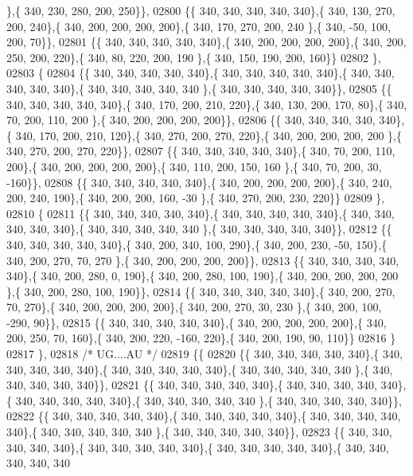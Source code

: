 \begin{DoxyCode}
      \},\{ 340, 230, 280, 200, 250\}\},
02800 \{\{ 340, 340, 340, 340, 340\},\{ 340, 130, 270, 200, 240\},\{ 340, 200, 200, 200, 200\},\{ 340, 170, 270, 200, 240
      \},\{ 340, -50, 100, 200,  70\}\},
02801 \{\{ 340, 340, 340, 340, 340\},\{ 340, 200, 200, 200, 200\},\{ 340, 200, 250, 200, 220\},\{ 340,  80, 220, 200, 190
      \},\{ 340, 150, 190, 200, 160\}\}
02802 \},
02803 \{
02804 \{\{ 340, 340, 340, 340, 340\},\{ 340, 340, 340, 340, 340\},\{ 340, 340, 340, 340, 340\},\{ 340, 340, 340, 340, 340
      \},\{ 340, 340, 340, 340, 340\}\},
02805 \{\{ 340, 340, 340, 340, 340\},\{ 340, 170, 200, 210, 220\},\{ 340, 130, 200, 170,  80\},\{ 340,  70, 200, 110, 200
      \},\{ 340, 200, 200, 200, 200\}\},
02806 \{\{ 340, 340, 340, 340, 340\},\{ 340, 170, 200, 210, 120\},\{ 340, 270, 200, 270, 220\},\{ 340, 200, 200, 200, 200
      \},\{ 340, 270, 200, 270, 220\}\},
02807 \{\{ 340, 340, 340, 340, 340\},\{ 340,  70, 200, 110, 200\},\{ 340, 200, 200, 200, 200\},\{ 340, 110, 200, 150, 160
      \},\{ 340,  70, 200,  30, -160\}\},
02808 \{\{ 340, 340, 340, 340, 340\},\{ 340, 200, 200, 200, 200\},\{ 340, 240, 200, 240, 190\},\{ 340, 200, 200, 160, -30
      \},\{ 340, 270, 200, 230, 220\}\}
02809 \},
02810 \{
02811 \{\{ 340, 340, 340, 340, 340\},\{ 340, 340, 340, 340, 340\},\{ 340, 340, 340, 340, 340\},\{ 340, 340, 340, 340, 340
      \},\{ 340, 340, 340, 340, 340\}\},
02812 \{\{ 340, 340, 340, 340, 340\},\{ 340, 200, 340, 100, 290\},\{ 340, 200, 230, -50, 150\},\{ 340, 200, 270,  70, 270
      \},\{ 340, 200, 200, 200, 200\}\},
02813 \{\{ 340, 340, 340, 340, 340\},\{ 340, 200, 280,   0, 190\},\{ 340, 200, 280, 100, 190\},\{ 340, 200, 200, 200, 200
      \},\{ 340, 200, 280, 100, 190\}\},
02814 \{\{ 340, 340, 340, 340, 340\},\{ 340, 200, 270,  70, 270\},\{ 340, 200, 200, 200, 200\},\{ 340, 200, 270,  30, 230
      \},\{ 340, 200, 100, -290,  90\}\},
02815 \{\{ 340, 340, 340, 340, 340\},\{ 340, 200, 200, 200, 200\},\{ 340, 200, 250,  70, 160\},\{ 340, 200, 220, -160, 
      220\},\{ 340, 200, 190,  90, 110\}\}
02816 \}
02817 \},
02818 \textcolor{comment}{/* UG....AU */}
02819 \{\{
02820 \{\{ 340, 340, 340, 340, 340\},\{ 340, 340, 340, 340, 340\},\{ 340, 340, 340, 340, 340\},\{ 340, 340, 340, 340, 340
      \},\{ 340, 340, 340, 340, 340\}\},
02821 \{\{ 340, 340, 340, 340, 340\},\{ 340, 340, 340, 340, 340\},\{ 340, 340, 340, 340, 340\},\{ 340, 340, 340, 340, 340
      \},\{ 340, 340, 340, 340, 340\}\},
02822 \{\{ 340, 340, 340, 340, 340\},\{ 340, 340, 340, 340, 340\},\{ 340, 340, 340, 340, 340\},\{ 340, 340, 340, 340, 340
      \},\{ 340, 340, 340, 340, 340\}\},
02823 \{\{ 340, 340, 340, 340, 340\},\{ 340, 340, 340, 340, 340\},\{ 340, 340, 340, 340, 340\},\{ 340, 340, 340, 340, 340

\end{DoxyCode}

